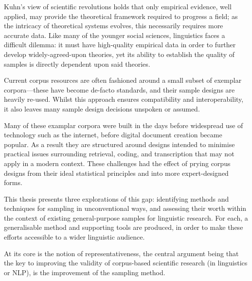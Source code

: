 

Kuhn's view of scientific revolutions\cite{kuhn1970structure}
holds that only empirical evidence, well applied, may provide the theoretical framework required to progress a field; as the intricacy of theoretical systems evolves, this necessarily requires more accurate data.  Like many of the younger social sciences, linguistics faces a difficult dilemma: it must have high-quality empirical data in order to further develop widely-agreed-upon theories, yet its ability to establish the quality of samples is directly dependent upon said theories.

Current corpus resources are often fashioned around a small subset of exemplar corpora---these have become de-facto standards, and their sample designs are heavily re-used.
Whilst this approach ensures compatibility and interoperability, it also leaves many sample design decisions unspoken or assumed.

Many of these examplar corpora were built in the days before widespread use of technology such as the internet, before digital document creation became popular.  As a result they are structured around designs intended to minimise practical issues surrounding retrieval, coding, and transcription that may not apply in a modern context.  These challenges had the effect of prying corpus designs from their ideal statistical principles and into more expert-designed forms\cite{atkins1992corpus}.

This thesis presents three explorations of this gap: identifying methods and techniques for sampling in unconventional ways, and assessing their worth within the context of existing general-purpose samples for linguistic research.  For each, a generalisable method and supporting tools are produced, in order to make these efforts accessible to a wider linguistic audience.

At its core is the notion of representativeness, the central argument being that the key to improving the validity of corpus-based scientific research (in linguistics or NLP), is the improvement of the sampling method.

